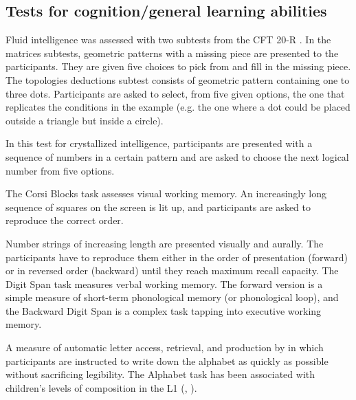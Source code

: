 \documentclass[output=paper]{langsci/langscibook}
\begin{document}
\subsection{Tests for cognition/general learning abilities}
\begin{description}\sloppy
\item[CFT 20-R: Matrices and topological deductions {\upshape\citep{Weiss2006}}:]  Fluid intelligence was assessed with two subtests from the CFT 20-R \citep{Weiss2006}. In the matrices subtests, geometric patterns with a missing piece are presented to the participants. They are given five choices to pick from and fill in the missing piece. The topologies deductions subtest consists of geometric pattern containing one to three dots. Participants are asked to select, from five given options, the one that replicates the conditions in the example (e.g. the one where a dot could be placed outside a triangle but inside a circle).

\item[CFT-20-R: Number sequences {\upshape\citep{Weiss2006}}:]  In this test for crystallized intelligence, participants are presented with a sequence of numbers in a certain pattern and are asked to choose the next logical number from five options.

\item[Corsi Blocks:] The Corsi Blocks task assesses visual working memory. An increasingly long sequence of squares on the screen is lit up, and participants are asked to reproduce the correct order.

\item[Digit Span (Forward/Backward):] Number strings of increasing length are presented visually and aurally. The participants have to reproduce them either in the order of presentation (forward) or in reversed order (backward) until they reach maximum recall capacity. The Digit Span task measures verbal working memory. The forward version is a simple measure of short-term phonological memory (or phonological loop), and the Backward Digit Span is a complex task tapping into executive working memory.

\item[Alphabet Task:] A measure of automatic letter access, retrieval, and production by \citet{BerningerEtAl1992} in which participants are instructed to write down the alphabet as quickly as possible without sacrificing legibility. The Alphabet task has been associated with children’s levels of composition in the L1 (\citealt{BerningerEtAl1997}, \citealt{GrahamEtAl2006}).


\end{description}
\end{document}
